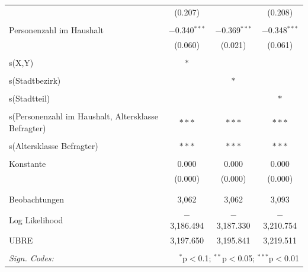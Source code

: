 \documentclass{Vorlage}
\begin{document}
\begin{appendix}
\begin{table}[h]
\begin{tabular}{@{\extracolsep{5pt}}lccc}
  & (0.207) &  & (0.208) \\ 
  & & & \\ 
 Personenzahl im Haushalt & $-$0.340$^{***}$ & $-$0.369$^{***}$ & $-$0.348$^{***}$ \\ 
  & (0.060) & (0.021) & (0.061) \\ 
  & & & \\ \hline
 s(X,Y) & $*$ &  &  \\ 
  & & & \\ 
 s(Stadtbezirk) &  & $*$ &  \\ 
  & & & \\ 
 s(Stadtteil)&  &  & $*$ \\ 
  & & & \\ 
 s(Personenzahl im Haushalt, Altersklasse Befragter) & $***$ & $***$ & $***$  \\ 
  & & & \\ 
 s(Altersklasse Befragter) & $***$ & $***$  & $***$ \\ 
  & & & \\ 
 Konstante & 0.000 & 0.000 & 0.000 \\ 
  & (0.000) & (0.000) & (0.000) \\ 
  & & & \\ 
\hline \\[-1.8ex] 
Beobachtungen & 3,062 & 3,062 & 3,093 \\ 
Log Likelihood & $-$3,186.494 & $-$3,187.330 & $-$3,210.754 \\ 
UBRE & 3,197.650 & 3,195.841 & 3,219.511 \\ 
\hline 
\hline \\[-1.8ex] 
\textit{Sign. Codes:}  & \multicolumn{3}{r}{$^{*}$p$<$0.1; $^{**}$p$<$0.05; $^{***}$p$<$0.01} \\ 
\end{tabular} 
\end{table} 


\end{appendix}
\end{document}
